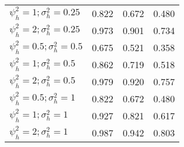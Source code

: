 \begin{table}[ht]
{\begin{tabular}{l c c c }
$\psi_h^2 = 1; \sigma_h^2 = 0.25$ & 0.822 & 0.672 & 0.480 \\
$\psi_h^2 = 2; \sigma_h^2 = 0.25$ & 0.973 & 0.901 & 0.734 \\
$\psi_h^2 = 0.5; \sigma_h^2 = 0.5$ & 0.675 & 0.521 & 0.358 \\
$\psi_h^2 = 1; \sigma_h^2 = 0.5$ & 0.862 & 0.719 & 0.518 \\
$\psi_h^2 = 2; \sigma_h^2 = 0.5$ & 0.979 & 0.920 & 0.757 \\
$\psi_h^2 = 0.5; \sigma_h^2 = 1$ & 0.822 & 0.672 & 0.480 \\
$\psi_h^2 = 1; \sigma_h^2 = 1$ & 0.927 & 0.821 & 0.617 \\
$\psi_h^2 = 2; \sigma_h^2 = 1$ & 0.987 & 0.942 & 0.803 \\
\bottomrule
\end{tabular}}
\end{table}




